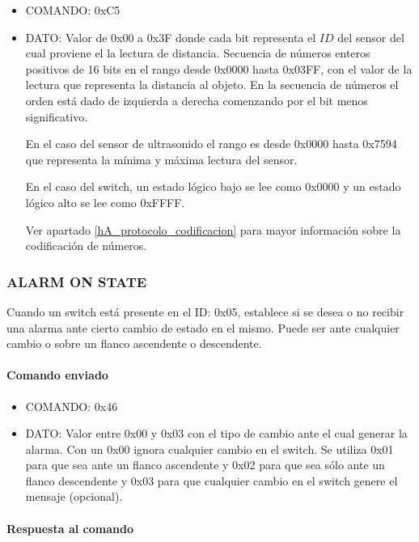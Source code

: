 \begin{itemize}
	\item{COMANDO:} 0xC5
	\item{DATO:} Valor de 0x00 a 0x3F donde cada bit representa el $ID$ del sensor del cual proviene el la lectura de distancia.
	Secuencia de n\'umeros enteros positivos de 16 bits en el rango desde 0x0000 hasta 0x03FF, con el valor de la lectura que representa la distancia al objeto.
	En la secuencia de n\'umeros el orden est\'a dado de izquierda a derecha comenzando por el bit menos significativo.

	En el caso del sensor de ultrasonido el rango es desde 0x0000 hasta 0x7594 que representa la m\'inima y m\'axima lectura del sensor.

	En el caso del switch, un estado l\'ogico bajo se lee como 0x0000 y un estado l\'ogico alto se lee como 0xFFFF.

	Ver apartado \ref{hA_protocolo_codificacion} para mayor informaci\'on sobre la codificaci\'on de n\'umeros.
\end{itemize}

\subsubsection{ALARM ON STATE}
\label{hA_protocolo_alarm_on_state_ds}

Cuando un switch est\'a presente en el ID: 0x05, establece si se desea o no recibir una alarma ante cierto cambio de estado en el mismo.
Puede ser ante cualquier cambio o sobre un flanco ascendente o descendente.

\paragraph*{Comando enviado}

\begin{itemize}
	\item{COMANDO:} 0x46
	\item{DATO:} Valor entre 0x00 y 0x03 con el tipo de cambio ante el cual generar la alarma.
	Con un 0x00 ignora cualquier cambio en el switch.
	Se utiliza 0x01 para que sea ante un flanco ascendente y 0x02 para que sea s\'olo ante un flanco descendente
	y 0x03 para que cualquier cambio en el switch genere el mensaje (opcional). 
\end{itemize}

\paragraph*{Respuesta al comando}


